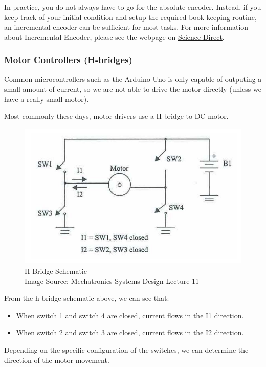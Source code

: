 \documentclass[paper=a4, fontsize=11pt]{article} %
\providecommand{\tightlist}{%
  \setlength{\itemsep}{0pt}\setlength{\parskip}{0pt}}
\numberwithin{equation}{section} %
\numberwithin{figure}{section} %
\numberwithin{table}{section} %
\begin{document}
In practice, you do not always have to go for the absolute encoder. Instead, if you keep track of your initial condition and setup the required book-keeping routine, an incremental encoder can be sufficient for most tasks. For more information about Incremental Encoder, please see the webpage on \href{https://www.sciencedirect.com/topics/engineering/incremental-encoder}{Science
Direct}.

\hypertarget{motor-controllers-h-bridges}{%
\subsubsection{Motor Controllers
(H-bridges)}\label{motor-controllers-h-bridges}}

Common microcontrollers such as the Arduino Uno is only capable of
outputing a small amount of current, so we are not able to drive the
motor directly (unless we have a really small motor).

Most commonly these days, motor drivers use a H-bridge to DC motor.

\begin{figure}[H]
    \centering
    \includegraphics[width = 0.6 \textwidth]{2019-08-05-21-37-19.png}
    \caption{H-Bridge Schematic \\
    Image Source: Mechatronics
Systems Design Lecture 11}
    \label{fig:h_bridge}
\end{figure}


From the h-bridge schematic above, we can see that:

\begin{itemize}
\tightlist
\item
  When switch 1 and switch 4 are closed, current flows in the I1
  direction.
\item
  When switch 2 and switch 3 are closed, current flows in the I2
  direction.
\end{itemize}

Depending on the specific configuration of the switches, we can
determine the direction of the motor movement.
\end{document}
